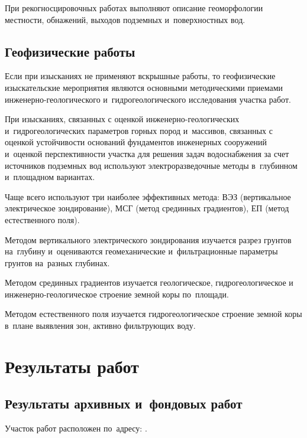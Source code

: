 При рекогносцировочных работах выполняют описание геоморфологии местности, обнажений, выходов подземных и~поверхностных вод.

\subsection{Геофизические работы}
Если при изысканиях не применяют вскрышные работы, то геофизические изыскательские мероприятия являются основными методическими приемами инженерно-геологического и~гидрогеологического исследования участка работ.

При изысканиях, связанных с оценкой инженерно-геологических и~гидрогеологических параметров горных пород и~массивов, связанных с оценкой устойчивости оснований фундаментов инженерных сооружений и~оценкой перспективности участка для решения задач водоснабжения за счет источников подземных вод используют электроразведочные методы в~глубинном и~площадном вариантах.

Чаще всего используют три наиболее эффективных метода:  ВЭЗ (вертикальное электрическое зондирование), МСГ (метод срединных градиентов), ЕП (метод естественного поля).

Методом вертикального электрического зондирования изучается разрез грунтов на~глубину и~оцениваются геомеханические и~фильтрационные параметры грунтов на~разных глубинах.

Методом срединных градиентов изучается геологическое, гидрогеологическое и инженерно-геологическое строение земной коры по~площади.

Методом естественного поля изучается гидрогеологическое строение земной коры в~плане выявления зон, активно фильтрующих воду.

\section{Результаты работ}
\subsection{Результаты архивных и~фондовых работ}
Участок работ расположен по~адресу: \txtAddress.

